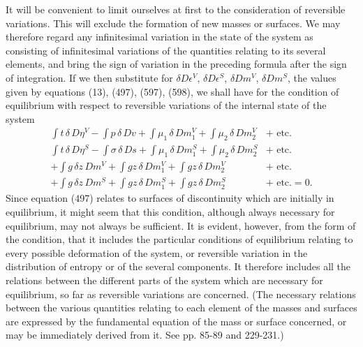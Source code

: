 \documentclass[12pt]{memoir}
\newcommand{\dd}{\delta}
\begin{document}
It will be convenient to limit ourselves at first to the consideration of reversible variations. This will exclude the formation of new masses or surfaces. We may therefore regard any infinitesimal variation in the state of the system as consisting of infinitesimal variations of the quantities relating to its several elements, and bring the sign of variation in the preceding formula after the sign of integration. If we then substitute for $\dd D\epsilon^V$, $\dd D\epsilon^S$, $\dd Dm^V$, $\dd Dm^S$, the values given by equations (13), (497), (597), (598), we shall have for the condition of equilibrium with respect to reversible variations of the internal state of the system
\begin{equation} \begin{aligned} \int t \, \dd \, D\eta^V - \int p \, \dd \, Dv+\int \mu_1 \,\dd\,Dm_1^V +\int \mu_2 \,\dd\,Dm_2^V &+\text{ etc.} \\
\int t \, \dd \, D\eta^S - \int \sigma \, \dd \, Ds+\int \mu_1 \,\dd\,Dm_1^S +\int \mu_2 \,\dd\,Dm_2^S &+ \text{ etc.} \\
+\int g \, \dd z \, Dm^V + \int gz \, \dd \, Dm_1^V +\int gz \, \dd \, Dm_2^V &+\text{ etc.}\\
+\int g \, \dd z \, Dm^S + \int gz \, \dd \, Dm_1^S +\int gz \, \dd \, Dm_2^S &+ \text{ etc.} =0.  \label{600} \end{aligned} \end{equation}
Since equation (497) relates to surfaces of discontinuity which are initially in equilibrium, it might seem that this condition, although always necessary for equilibrium, may not always be sufficient. It is evident, however, from the form of the condition, that it includes the particular conditions of equilibrium relating to every possible deformation of the system, or reversible variation in the distribution of entropy or of the several components. It therefore includes all the relations between the different parts of the system which are necessary for equilibrium, so far as reversible variations are concerned. (The necessary relations between the various quantities relating to each element of the masses and surfaces are expressed by the fundamental equation of the mass or surface concerned, or may be immediately derived from it. See pp. 85-89 and 229-231.)
\end{document}
